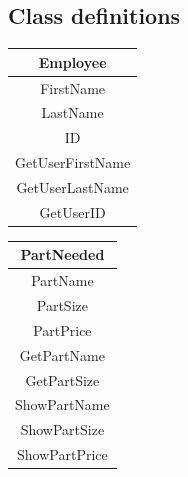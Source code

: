 \subsection{Class definitions}
\begin{center}
\begin{tabular}{ |c| }
\hline
\textbf{Employee}\\
\hline
FirstName\\
LastName\\
ID\\
\hline
GetUserFirstName\\
GetUserLastName\\
GetUserID\\
\hline
\end{tabular}
\end{center}
\begin{center}
\begin{tabular}{ |c| }
\hline
\textbf{PartNeeded}\\
\hline
PartName\\
PartSize\\
PartPrice\\
\hline
GetPartName\\
GetPartSize\\
ShowPartName\\
ShowPartSize\\
ShowPartPrice\\
\hline
\end{tabular}
\end{center}

